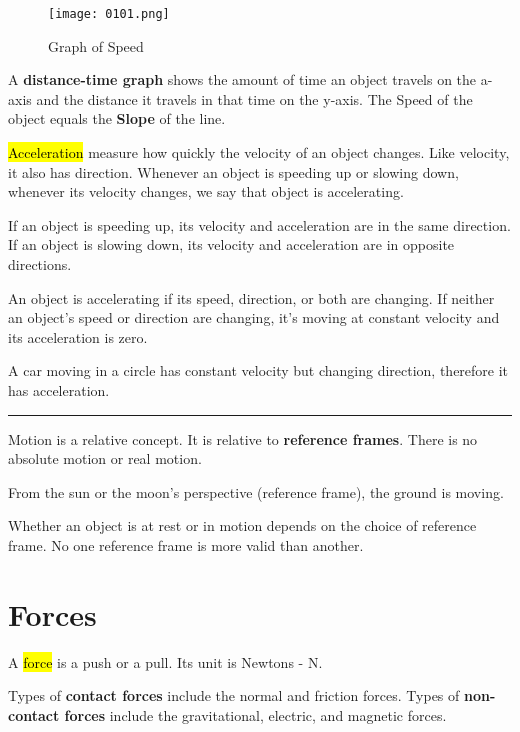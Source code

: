 \newpage

\begin{figure}[htb!]
  \centering
  \texttt{[image: 0101.png]}
  \caption{Graph of Speed}
\end{figure}

A \textbf{distance-time graph} shows the amount of time an object travels on the a-axis and the distance it travels in that time on the y-axis. The Speed of the object equals the \textbf{Slope} of the line.

\vspace{.5cm}


\hl{Acceleration} measure how quickly the velocity of an object changes. Like velocity, it also has direction. Whenever an object is speeding up or slowing down, whenever its velocity changes, we say that object is accelerating.

If an object is speeding up, its velocity and acceleration are in the same direction. If an object is slowing down, its velocity and acceleration are in opposite directions.

An object is accelerating if its speed, direction, or both are changing. If neither an object's speed or direction are changing, it's moving at constant velocity and its acceleration is zero.

A car moving in a circle has constant velocity but changing direction, therefore it has acceleration.

\noindent\rule{\textwidth}{0.4pt}

Motion is a relative concept. It is relative to \textbf{reference frames}. There is no absolute motion or real motion.

From the sun or the moon's perspective (reference frame), the ground is moving.

Whether an object is at rest or in motion depends on the choice of reference frame. No one reference frame is more valid than another.

\section{Forces}

A \hl{force} is a push or a pull. Its unit is Newtons - N.

Types of \textbf{contact forces} include the normal and friction forces. Types of \textbf{non-contact forces} include the gravitational, electric, and magnetic forces.


